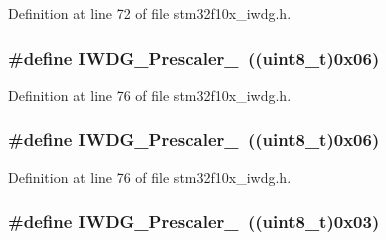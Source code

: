 Definition at line 72 of file stm32f10x\+\_\+iwdg.\+h.

\subsubsection[{\texorpdfstring{I\+W\+D\+G\+\_\+\+Prescaler\+\_\+256}{IWDG_Prescaler_256}}]{\setlength{\rightskip}{0pt plus 5cm}\#define I\+W\+D\+G\+\_\+\+Prescaler\+\_~(({\bf uint8\+\_\+t})0x06)}\hypertarget{group___i_w_d_g__prescaler_ga7d6e918748185639049644c970db2b43}{}\label{group___i_w_d_g__prescaler_ga7d6e918748185639049644c970db2b43}


Definition at line 76 of file stm32f10x\+\_\+iwdg.\+h.

\subsubsection[{\texorpdfstring{I\+W\+D\+G\+\_\+\+Prescaler\+\_\+256}{IWDG_Prescaler_256}}]{\setlength{\rightskip}{0pt plus 5cm}\#define I\+W\+D\+G\+\_\+\+Prescaler\+\_~(({\bf uint8\+\_\+t})0x06)}\hypertarget{group___i_w_d_g__prescaler_ga7d6e918748185639049644c970db2b43}{}\label{group___i_w_d_g__prescaler_ga7d6e918748185639049644c970db2b43}


Definition at line 76 of file stm32f10x\+\_\+iwdg.\+h.

\subsubsection[{\texorpdfstring{I\+W\+D\+G\+\_\+\+Prescaler\+\_\+32}{IWDG_Prescaler_32}}]{\setlength{\rightskip}{0pt plus 5cm}\#define I\+W\+D\+G\+\_\+\+Prescaler\+\_~(({\bf uint8\+\_\+t})0x03)}\hypertarget{group___i_w_d_g__prescaler_gaa8b091b6e4102513b1e3a1c4eb6756ba}{}\label{group___i_w_d_g__prescaler_gaa8b091b6e4102513b1e3a1c4eb6756ba}


